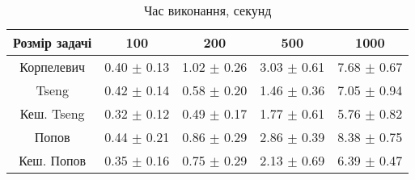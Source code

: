 \begin{table}[H]
	\centering
	\begin{tabular}{|c||c|c|c|c|}\hline
		Розмір задачі & 100 & 200 & 500 & 1000 \\ \hline \hline
		Корпелевич & 0.40 $\pm$ 0.13 & 1.02 $\pm$ 0.26 & 3.03 $\pm$ 0.61 & 7.68 $\pm$ 0.67 \\ \hline
		Tseng & 0.42 $\pm$ 0.14 & 0.58 $\pm$ 0.20 & 1.46 $\pm$ 0.36 & 7.05 $\pm$ 0.94 \\ \hline
		Кеш. Tseng & 0.32 $\pm$ 0.12 & 0.49 $\pm$ 0.17 & 1.77 $\pm$ 0.61 & 5.76 $\pm$ 0.82 \\ \hline
		Попов & 0.44 $\pm$ 0.21 & 0.86 $\pm$ 0.29 & 2.86 $\pm$ 0.39 & 8.38 $\pm$ 0.75 \\ \hline
		Кеш. Попов & 0.35 $\pm$ 0.16 & 0.75 $\pm$ 0.29 & 2.13 $\pm$ 0.69 & 6.39 $\pm$ 0.47 \\ \hline
	\end{tabular}
	\caption{Час виконання, секунд}
\end{table}
